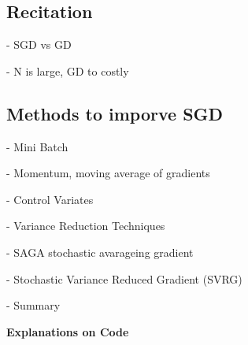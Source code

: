 \subsection{Recitation}

- SGD vs GD

- N is large, GD to costly

\subsection{Methods to imporve SGD}

- Mini Batch

- Momentum, moving average of gradients

- Control Variates

- Variance Reduction Techniques

- SAGA stochastic avarageing gradient

- Stochastic Variance Reduced Gradient (SVRG)

- Summary

\textbf{Explanations on Code}
